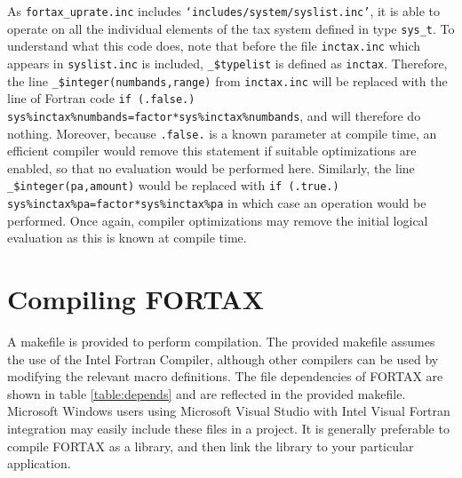 \documentclass[11pt,thmsa,letter,ukenglish]{article}
\begin{document}
As \texttt{fortax\_uprate.inc} includes \texttt{`includes/system/syslist.inc'}, it is able to operate on all the individual elements of the tax system defined in type \texttt{sys\_t}. To understand what this code does, note that before the file \texttt{inctax.inc} which appears in \texttt{syslist.inc} is included, \texttt{\_\$typelist} is defined as \texttt{inctax}. Therefore, the line \texttt{\_\$integer(numbands,range)} from \texttt{inctax.inc} will be replaced with the line of Fortran code \texttt{if (.false.) sys\%inctax\%numbands=factor*sys\%inctax\%numbands}, and will therefore do nothing. Moreover, because \texttt{.false.} is a known parameter at compile time, an efficient compiler would remove this statement if suitable optimizations are enabled, so that no evaluation would be performed here. Similarly, the line \texttt{\_\$integer(pa,amount)} would be replaced with \texttt{if (.true.) sys\%inctax\%pa=factor*sys\%inctax\%pa} in which case an operation would be performed. Once again, compiler optimizations may remove the initial logical evaluation as this is known at compile time.

\section{Compiling FORTAX}\label{sec:compile}

A makefile is provided to perform compilation. The provided makefile assumes the use of the Intel Fortran Compiler, although other compilers can be used by modifying the relevant macro definitions. The file dependencies of FORTAX are shown in table \ref{table:depends} and are reflected in the provided makefile. Microsoft Windows users using Microsoft Visual Studio with Intel Visual Fortran integration may easily include these files in a project. It is generally preferable to compile FORTAX as a library, and then link the library to your particular application.
\end{document}
